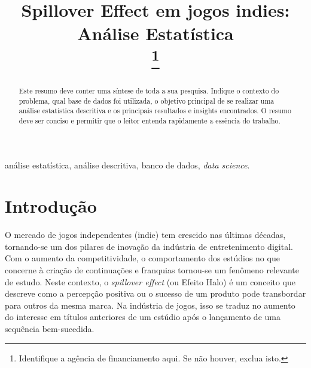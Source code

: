 \documentclass[conference]{IEEEtran}
\begin{document}
\title{Spillover Effect em jogos indies: Análise Estatística\\
\thanks{Identifique a agência de financiamento aqui. Se não houver, exclua isto.}
}

\author{
\and
{}
\and
{}
}

\maketitle

\begin{abstract}
Este resumo deve conter uma síntese de toda a sua pesquisa. 
Indique o contexto do problema, qual base de dados foi utilizada, 
o objetivo principal de se realizar uma análise estatística 
descritiva e os principais resultados e insights encontrados. 
O resumo deve ser conciso e permitir que o leitor entenda 
rapidamente a essência do trabalho.
\end{abstract}

\begin{IEEEkeywords}
análise estatística, análise descritiva, banco de dados, \textit{data science}.
\end{IEEEkeywords}

\section{Introdução}
O mercado de jogos independentes (indie) tem crescido nas últimas décadas, 
tornando-se um dos pilares de inovação da indústria de entretenimento digital. 
Com o aumento da competitividade, o comportamento dos estúdios no que concerne 
à criação de continuações e franquias tornou-se um fenômeno relevante de estudo. 
Neste contexto, o \textit{spillover effect} (ou Efeito Halo) é um conceito que 
descreve como a percepção positiva ou o sucesso de um produto pode transbordar 
para outros da mesma marca. 
Na indústria de jogos, isso se traduz no aumento do interesse em títulos 
anteriores de um estúdio após o lançamento de uma sequência bem-sucedida.
\end{document}
